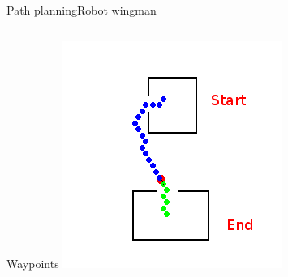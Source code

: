 \begin{frame}{Path planning}{Robot wingman}
\begin{columns}
\begin{minipage}{\textwidth}
\begin{block}{Waypoints}
\centering
\includegraphics[width = \textwidth]{./figure/simulation/waypoint.png}
\end{block}
\end{minipage}

\end{columns}


\begin{columns}


\end{columns}
\end{frame}
